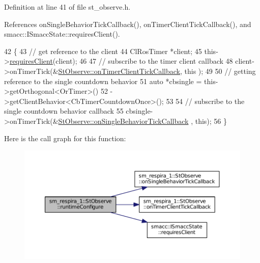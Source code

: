 Definition at line 41 of file st\+\_\+observe.\+h.



References on\+Single\+Behavior\+Tick\+Callback(), on\+Timer\+Client\+Tick\+Callback(), and smacc\+::\+I\+Smacc\+State\+::requires\+Client().


\begin{DoxyCode}
42     \{
43         \textcolor{comment}{// get reference to the client}
44         ClRosTimer *client;
45         this->\hyperlink{classsmacc_1_1ISmaccState_a7f95c9f0a6ea2d6f18d1aec0519de4ac}{requiresClient}(client);
46 
47         \textcolor{comment}{// subscribe to the timer client callback}
48         client->onTimerTick(&\hyperlink{structsm__respira__1_1_1StObserve_a83c485ad4ae46796d84eb04ddabd97a2}{StObserve::onTimerClientTickCallback}, \textcolor{keyword}{this}
      );
49 
50         \textcolor{comment}{// getting reference to the single countdown behavior}
51         \textcolor{keyword}{auto} *cbsingle = this->getOrthogonal<OrTimer>()
52                              ->getClientBehavior<CbTimerCountdownOnce>();
53 
54         \textcolor{comment}{// subscribe to the single countdown behavior callback}
55         cbsingle->onTimerTick(&\hyperlink{structsm__respira__1_1_1StObserve_abe113ea6ed3da4ae0d97830bc7dae030}{StObserve::onSingleBehaviorTickCallback}
      , \textcolor{keyword}{this});
56     \}
\end{DoxyCode}


Here is the call graph for this function\+:
\nopagebreak
\begin{figure}[H]
\begin{center}
\leavevmode
\includegraphics[width=350pt]{structsm__respira__1_1_1StObserve_a3c1fe027b9396233475e8bd94fed6df7_cgraph}
\end{center}
\end{figure}


